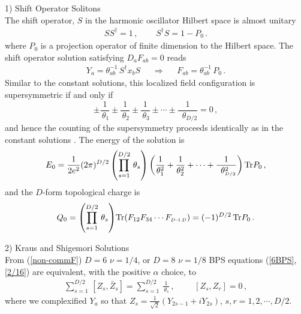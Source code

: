 \documentclass[a4paper,11pt]{article}
\def\Tr{{\rm Tr}}
\begin{document}
1) Shift Operator Solitons\\
The shift operator, $S$ in the harmonic oscillator Hilbert space is almost unitary
\begin{equation}
\begin{array}{cc}
SS^{\dagger}=1\,,~~~&~~~S^{\dagger}S=1-P_{0}\,.
\end{array}
\end{equation}
where $P_{0}$ is a projection operator of finite dimension to the Hilbert space. The shift operator solution   satisfying $D_{a}F_{ab}=0$ reads
\cite{shift,witten,park,aganagic}
\begin{equation}
\begin{array}{ccc}
Y_{a}=\theta^{-1}_{ab}\,S^{\dagger}x_{b}S~~~&~\Longrightarrow~&~~~F_{ab}=\theta^{-1}_{ab}\,P_{0}\,.
\end{array}
\end{equation}
Similar to the constant solutions, this localized field configuration is supersymmetric if and only if
\begin{equation}
\displaystyle{\pm \frac{1}{\,\theta_1}\pm\frac{1}{\,\theta_2}\pm\frac{1}{\,\theta_3}\pm\cdots\pm\frac{1}{\,\,\,\theta_{{\scriptscriptstyle
D/2}}}}=0\,,
\end{equation}
and hence the counting of the supersymmetry proceeds identically as in the constant solutions \cite{witten,Fujii:2001wp}. The energy of the solution
is
\begin{equation}
E_{0}=\displaystyle{\frac{1}{2e^{2}}(2\pi)^{D/2}\left(\prod_{s=1}^{D/2}\, \theta_s\right)\left(\frac{1}{\theta_1^2}+\frac{1}{\theta_2^2} +\cdots
+\frac{1}{\,\,\,\theta_{{\scriptscriptstyle  D/2}}^2}\right) \Tr P_0\,,} \label{shiftE}
\end{equation}
and the $D$-form topological charge is
\begin{equation}
Q_{0}=\displaystyle{\left(\prod_{s=1}^{D/2}\,\theta_s\right)} \Tr (F_{12}F_{34}\cdots F_{{\scriptscriptstyle D\!-\!1\,D}})=(-1)^{D/2}\,\Tr P_{0}\,.
\label{Q0}
\end{equation}



2) Kraus and Shigemori Solutions\\
From  (\ref{non-commF})   $D=6$ $\nu=1/4$, or $D=8$ $\nu=1/8$ BPS equations (\ref{6BPS},\ref{2/16}) are equivalent, with the positive $\alpha$
choice, to
\begin{equation}
\begin{array}{ll}
\displaystyle{\sum_{s=1}^{D/2}\,[Z_{s},\bar{Z}_{s}]=\sum_{s=1}^{D/2}\,\frac{1}{\,\theta_{s}}}\,,~~~&~~~~[Z_{s},Z_{r}]=0\,,
\end{array}
\label{ncBPS}
\end{equation}
where we complexified $Y_{a}$ so that $Z_{s}=\frac{1}{\sqrt{2}}(Y_{{\scriptscriptstyle 2}s{\scriptscriptstyle -}\!{\scriptscriptstyle
1}}+iY_{{\scriptscriptstyle 2}s})$, $s,r=1,2,\cdots,D/2$.
\end{document}
